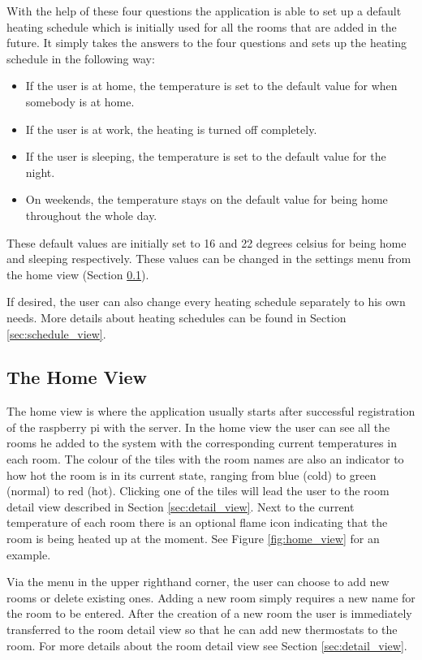 With the help of these four questions the application is able to set up a default heating schedule which is initially used for all the rooms that are added in the future. It simply takes the answers to the four questions and sets up the heating schedule in the following way: 

\begin{itemize}
\item{If the user is at home, the temperature is set to the default value for when somebody is at home.}
\item{If the user is at work, the heating is turned off completely.}
\item{If the user is sleeping, the temperature is set to the default value for the night.}
\item{On weekends, the temperature stays on the default value for being home throughout the whole day.}
\end{itemize}

These default values are initially set to 16 and 22 degrees celsius for being home and sleeping respectively. These values can be changed in the settings menu from the home view (Section \ref{sec:home_view}).

If desired, the user can also change every heating schedule separately to his own needs. More details about heating schedules can be found in Section \ref{sec:schedule_view}.

\subsection{The Home View}
\label{sec:home_view}
The home view is where the application usually starts after successful registration of the raspberry pi with the server. In the home view the user can see all the rooms he added to the system with the corresponding current temperatures in each room. The colour of the tiles with the room names are also an indicator to how hot the room is in its current state, ranging from blue (cold) to green (normal) to red (hot). Clicking one of the tiles will lead the user to the room detail view described in Section \ref{sec:detail_view}. Next to the current temperature of each room there is an optional flame icon indicating that the room is being heated up at the moment. See Figure \ref{fig:home_view} for an example.

Via the menu in the upper righthand corner, the user can choose to add new rooms or delete existing ones. Adding a new room simply requires a new name for the room to be entered. After the creation of a new room the user is immediately transferred to the room detail view so that he can add new thermostats to the room. For more details about the room detail view see Section \ref{sec:detail_view}.

